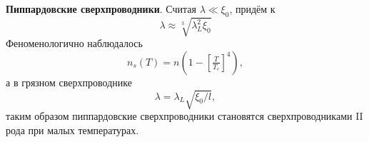 

\textbf{Пиппардовские сверхпроводники}. Считая $\lambda \ll \xi_0$, придём к
\begin{equation*}
	\lambda \approx \sqrt[3]{\lambda_L^2 \xi_0}
\end{equation*}
Феноменологично наблюдалось
\begin{equation*}
	n_s(T) = n \left(
		1- \left[\tfrac{T}{T_c}\right]^4
	\right),
\end{equation*}
а в грязном сверхпроводнике
\begin{equation*}
	\lambda = \lambda_L \sqrt{\xi_0/l},
\end{equation*}
таким образом пиппардовские сверхпроводники становятся сверхпроводниками II рода при малых температурах.

% 